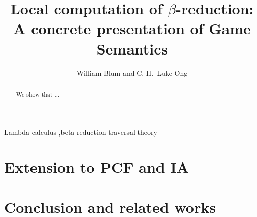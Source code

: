 \documentclass[preprint,11pt,draft,a4paper]{elsarticle}
\begin{document}
\begin{keyword}
Lambda calculus \sep beta-reduction
traversal theory
\end{keyword}
\begin{frontmatter}
\title{Local computation of $\beta$-reduction:\\A concrete presentation of Game Semantics}
\author{William Blum and C.-H.~Luke Ong}
\address{Oxford University Computing Laboratory}
\begin{abstract}
We show that ...
\end{abstract}
\end{frontmatter}

\tableofcontents \bigskip

\listoftodos
\bigskip

    

    \section{Extension to PCF and IA}
    

    \section{Conclusion and related works}
    




\end{document}
